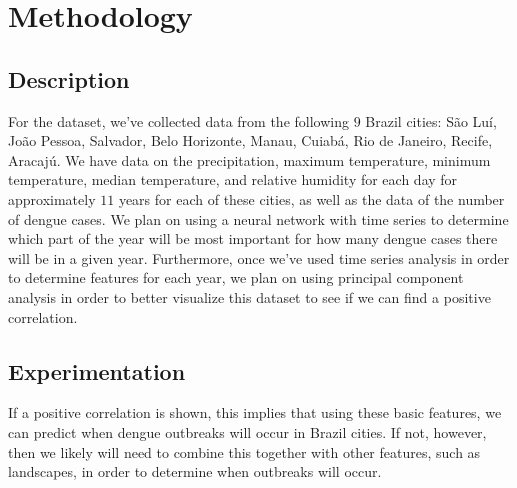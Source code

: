 \documentclass[11pt]{article}
\begin{document}
\section{Methodology}
\subsection{Description}
For the dataset, we've collected data from the following $9$ Brazil cities: São Luí, João Pessoa, Salvador, Belo Horizonte, Manau, Cuiabá, Rio de Janeiro, Recife, Aracajú. We have data on the precipitation, maximum temperature, minimum temperature, median temperature, and relative humidity for each day for approximately $11$ years for each of these cities, as well as the data of the number of dengue cases. We plan on using a neural network with time series to determine which part of the year will be most important for how many dengue cases there will be in a given year. Furthermore, once we've used time series analysis in order to determine features for each year, we plan on using principal component analysis in order to better visualize this dataset to see if we can find a positive correlation. 
\subsection{Experimentation}
If a positive correlation is shown, this implies that using these basic features, we can predict when dengue outbreaks will occur in Brazil cities. If not, however, then we likely will need to combine this together with other features, such as landscapes, in order to determine when outbreaks will occur. 
\end{document}
